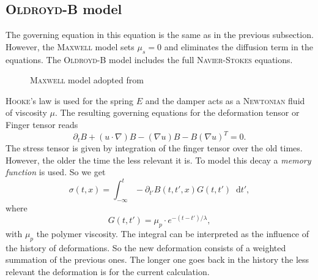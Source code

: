 \documentclass[12pt,a4paper,twoside, open=right]{scrreprt}
\theoremstyle{definition}
\theoremstyle{plain}
\newcommand{\D}{\mathop{}\!\mathrm{d}}
\begin{document}
\subsection{\textsc{Oldroyd-B} model}
The governing equation in this equation is the same as in the previous subsection. However, the \textsc{Maxwell} model sets $\mu_s=0$ and eliminates the diffusion term in the equations. The \textsc{Oldroyd-B} model includes the full \textsc{Navier-Stokes} equations.
\begin{figure}
    \centering
    
    \def\svgwidth{0.5\textwidth}
    
    \caption[\textsc{Maxwell} model]{\textsc{Maxwell} model adopted from \cite{Pekaje}}
    \label{fig:maxwell}
    
\end{figure}
\textsc{Hooke}'s law is used for the spring $E$ and the damper acts as a \textsc{Newtonian} fluid of viscosity $\mu$. 
The resulting governing equations for the deformation tensor or Finger tensor reads
\begin{equation}
    \partial_t B + (u\cdot\nabla)B-(\nabla u)B-B(\nabla u)^T =0.
\end{equation}
The stress tensor is given by integration of the finger tensor over the old times. However, the older the time the less relevant it is. To model this decay a \emph{memory function} is used. So we get
\begin{equation}
     \sigma(t,x) = \int_{-\infty}^t-\partial_{t'}B(t,t',x)G(t,t')\D t',
\end{equation}
where 
\begin{equation}
    G(t,t')=\mu_p\cdot e^{-(t-t')/\lambda},
\end{equation}
with $\mu_p$ the polymer viscosity. The integral can be interpreted as the influence of the history of deformations. So the new deformation consists of a weighted summation of the previous ones. The longer one goes back in the history the less relevant the deformation is for the current calculation.
\end{document}
